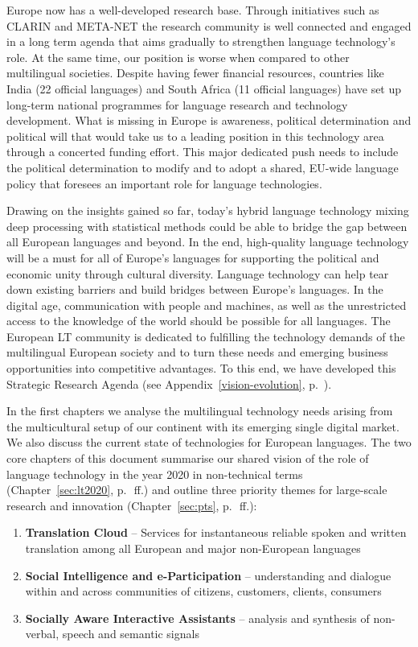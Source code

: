 \documentclass[10pt, plain]{../../metanetpaper}
\begin{document}
\begin{multicols}{2}
Europe now has a well-developed research base. Through initiatives such as CLARIN and META-NET the research community is well connected and engaged in a long term agenda that aims gradually to strengthen language technology's role. At the same time, our position is worse when compared to other multilingual societies. Despite having fewer financial resources, countries like India (22 official languages) and South Africa (11 official languages) have set up long-term national programmes for language research and technology development. What is missing in Europe is awareness, political determination and political will that would take us to a leading position in this technology area through a concerted funding effort. This major dedicated push needs to include the political determination to modify and to adopt a shared, EU-wide language policy that foresees an important role for language technologies. 

Drawing on the insights gained so far, today’s hybrid language technology mixing deep processing with statistical methods could be able to bridge the gap between all European languages and beyond. In the end, high-quality language technology will be a must for all of Europe's languages for supporting the political and economic unity through cultural diversity. Language technology can help tear down existing barriers and build bridges between Europe’s languages. In the digital age, communication with people and machines, as well as the unrestricted access to the knowledge of the world should be possible for all languages. The European LT community is dedicated to fulfilling the technology demands of the multilingual European society and to turn these needs and emerging business opportunities into competitive advantages. To this end, we have developed this Strategic Research Agenda (see Appendix~\ref{vision-evolution}, p.~\pageref{vision-evolution}).

In the first chapters we analyse the multilingual technology needs arising from the multicultural setup of our continent with its emerging single digital market. We also discuss the current state of technologies for European languages. The two core chapters of this document summarise our shared vision of the role of language technology in the year 2020 in non-technical terms (Chapter~\ref{sec:lt2020}, p.~\pageref{sec:lt2020}\,ff.) and outline three priority themes for large-scale research and innovation (Chapter~\ref{sec:pts}, p.~\pageref{sec:pts}\,ff.):

\begin{enumerate}
\item \textbf{Translation Cloud} -- Services for instantaneous reliable spoken and written translation among all European and major non-European languages
\item \textbf{Social Intelligence and e-Participation} -- understanding and dialogue within and across communities of citizens, customers, clients, consumers
\item \textbf{Socially Aware Interactive Assistants} -- analysis and synthesis of non-verbal, speech and semantic signals
\end{enumerate}
 

\end{multicols}
\end{document}
